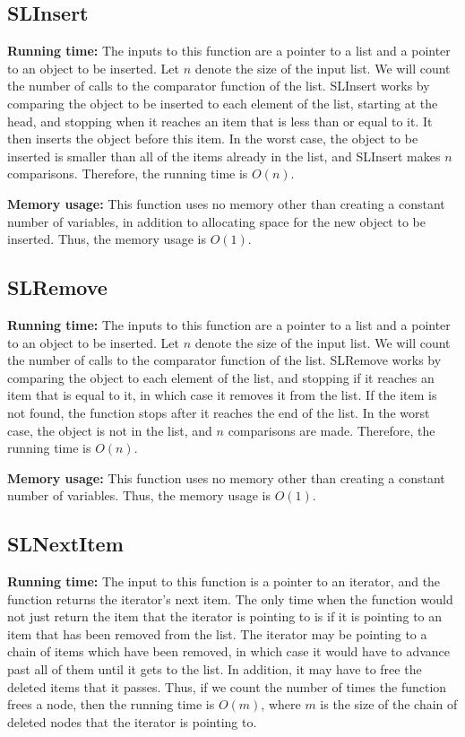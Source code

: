 \documentclass{article}
\begin{document}
\subsection{SLInsert}

\textbf{Running time:} The inputs to this function are a pointer to a list and a pointer to an object to be inserted. Let $n$ denote the size of
the input list. We will count the number of calls to the comparator function of the list. SLInsert works by comparing the
object to be inserted to each element of the list, starting at the head, and stopping when it reaches an item that is
less than or equal to it. It then inserts the object before this item. In the worst case, the object to be inserted is
smaller than all of the items already in the list, and SLInsert makes $n$ comparisons. Therefore, the running time is
$O(n)$.

\noindent\textbf{Memory usage:} This function uses no memory other than creating a constant number of variables, in addition to allocating
space for the new object to be inserted. Thus, the memory usage is $O(1)$.

\subsection{SLRemove}

\textbf{Running time:} The inputs to this function are a pointer to a list and a pointer to an object to be inserted.
Let $n$ denote the size of the input list. We will count the number of calls to the comparator function of the list.
SLRemove works by comparing the object to each element of the list, and stopping if it reaches an item that is equal to
it, in which case it removes it from the list. If the item is not found, the function stops after it reaches the end of the list. In the worst case, the object
is not in the list, and $n$ comparisons are made. Therefore, the running time is $O(n)$.

\noindent\textbf{Memory usage:} This function uses no memory other than creating a constant number of variables. Thus, the memory usage is $O(1)$.

\subsection{SLNextItem}

\textbf{Running time:} The input to this function is a pointer to an iterator, and the function returns the
iterator's next item. The only time when the function would not just return the item that the iterator is pointing to is
if it is pointing to an item that has been removed from the list. The iterator may be pointing to a chain of items
which have been removed, in which case it would have to advance past all of them until it gets to the list. In addition,
it may have to free the deleted items that it passes. Thus, if we count the number of times the function frees a node,
then the running time is $O(m)$, where $m$ is the size of the chain of deleted nodes that the iterator is pointing to.
\end{document}

